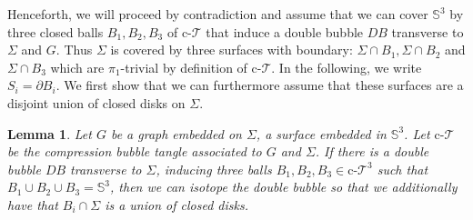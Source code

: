 \documentclass[11pt,a4paper]{article}
\newcommand{\Sp}{\mathbb S}
\newcommand{\cT}{\text{c-}\mathcal{T}}
\newtheorem{lem}[theorem]{Lemma}
\begin{document}
Henceforth, we will proceed by contradiction and assume that we can cover $\Sp^3$ by three closed balls $B_1,B_2,B_3$ of $\cT$ that induce a double bubble $DB$ transverse to $\Sigma$ and $G$. Thus $\Sigma$ is covered by three surfaces with boundary: $\Sigma \cap B_1, \Sigma \cap B_2$ and $\Sigma \cap B_3$ which are $\pi_1$-trivial by definition of $\cT$. In the following, we write $S_i = \partial B_i$. We first show that we can furthermore assume that these surfaces are a disjoint union of closed disks on $\Sigma$.

\begin{lem}\label{lem_Sigma_disks}
  Let $G$ be a graph embedded on $\Sigma$, a surface embedded in $\Sp^3$. Let $\cT$ be the compression bubble tangle associated to $G$ and $\Sigma$. If there is a double bubble $DB$ transverse to $\Sigma$, inducing three balls $B_1,B_2,B_3 \in \cT^3$ such that $B_1 \cup B_2 \cup B_3 = \Sp^3$, then we can isotope the double bubble so that we additionally have that $B_i \cap \Sigma$ is a union of closed disks.
\end{lem}
\end{document}
